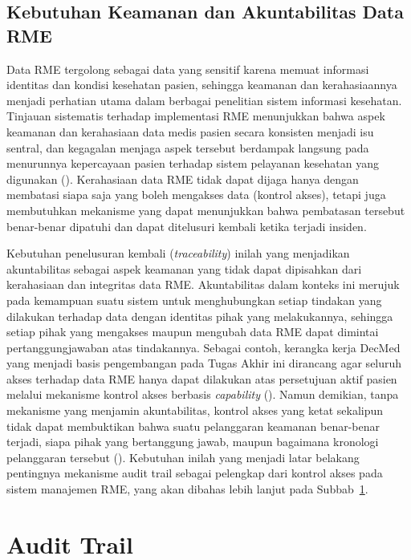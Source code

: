 \subsection{Kebutuhan Keamanan dan Akuntabilitas Data RME}
\label{subsec:keamanan-akuntabilitas-rme}

Data RME tergolong sebagai data yang sensitif karena memuat informasi identitas dan kondisi kesehatan pasien, sehingga keamanan dan kerahasiaannya menjadi perhatian utama dalam berbagai penelitian sistem informasi kesehatan. Tinjauan sistematis terhadap implementasi RME menunjukkan bahwa aspek keamanan dan kerahasiaan data medis pasien secara konsisten menjadi isu sentral, dan kegagalan menjaga aspek tersebut berdampak langsung pada menurunnya kepercayaan pasien terhadap sistem pelayanan kesehatan yang digunakan (\cite{pramesti2024keamanan}). Kerahasiaan data RME tidak dapat dijaga hanya dengan membatasi siapa saja yang boleh mengakses data (kontrol akses), tetapi juga membutuhkan mekanisme yang dapat menunjukkan bahwa pembatasan tersebut benar-benar dipatuhi dan dapat ditelusuri kembali ketika terjadi insiden.

Kebutuhan penelusuran kembali (\textit{traceability}) inilah yang menjadikan akuntabilitas sebagai aspek keamanan yang tidak dapat dipisahkan dari kerahasiaan dan integritas data RME. Akuntabilitas dalam konteks ini merujuk pada kemampuan suatu sistem untuk menghubungkan setiap tindakan yang dilakukan terhadap data dengan identitas pihak yang melakukannya, sehingga setiap pihak yang mengakses maupun mengubah data RME dapat dimintai pertanggungjawaban atas tindakannya. Sebagai contoh, kerangka kerja DecMed yang menjadi basis pengembangan pada Tugas Akhir ini dirancang agar seluruh akses terhadap data RME hanya dapat dilakukan atas persetujuan aktif pasien melalui mekanisme kontrol akses berbasis \textit{capability} (\cite{DecMed}). Namun demikian, tanpa mekanisme yang menjamin akuntabilitas, kontrol akses yang ketat sekalipun tidak dapat membuktikan bahwa suatu pelanggaran keamanan benar-benar terjadi, siapa pihak yang bertanggung jawab, maupun bagaimana kronologi pelanggaran tersebut (\cite{DecMed}). Kebutuhan inilah yang menjadi latar belakang pentingnya mekanisme audit trail sebagai pelengkap dari kontrol akses pada sistem manajemen RME, yang akan dibahas lebih lanjut pada Subbab~\ref{sec:audit-trail}.

\section{Audit Trail}
\label{sec:audit-trail}

